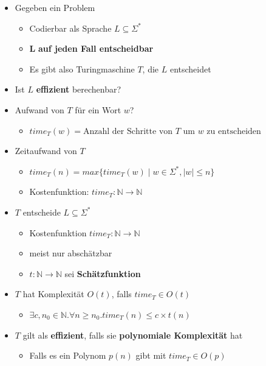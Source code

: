 \documentclass{scrartcl}
\begin{document}
\begin{itemize}
	\item Gegeben ein Problem
	\begin{itemize}
		\item Codierbar als Sprache $L \subseteq \Sigma^*$
		\item $\mathbf{L}$ \textbf{auf jeden Fall entscheidbar}
		\item Es gibt also Turingmaschine $T$, die $L$ entscheidet
	\end{itemize}
	\item Ist $L$ \textbf{effizient} berechenbar?
	\item Aufwand von $T$ für ein Wort $w$?
	\begin{itemize}
		\item $time_T(w) = \text{Anzahl der Schritte von } T \text{ um } w \text{ zu entscheiden}$
	\end{itemize}
	\item Zeitaufwand von $T$
	\begin{itemize}
		\item $time_T(n) = max\{ time_T(w) \mid w \in \Sigma^*, |w| \leq n \}$
		\item Kostenfunktion: $time_T: \mathbb{N} \rightarrow \mathbb{N}$
	\end{itemize}
	\item $T$ entscheide $L \subseteq \Sigma^*$
	\begin{itemize}
		\item Kostenfunktion $time_T: \mathbb{N} \rightarrow \mathbb{N}$
		\item meist nur abschätzbar
		\item $t: \mathbb{N} \rightarrow \mathbb{N}$ sei \textbf{Schätzfunktion}
	\end{itemize}
	\item $T$ hat Komplexität $O(t)$, falls $time_T \in O(t)$
	\begin{itemize}
		\item $\exists c,n_0 \in \mathbb{N}. \forall n \geq n_0. time_T(n) \leq c \times t(n)$
	\end{itemize}
	\item $T$ gilt als \textbf{effizient}, falls sie \textbf{polynomiale Komplexität} hat
	\begin{itemize}
		\item Falls es ein Polynom $p(n)$ gibt mit $time_T \in O(p)$
	\end{itemize}
\end{itemize}
\end{document}
